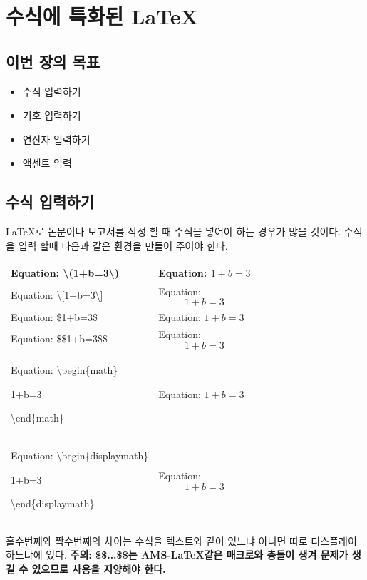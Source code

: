 \documentclass[12pt]{article}
\begin{document}
	\section{수식에 특화된 \LaTeX}
	\subsection{이번 장의 목표}
	\begin{itemize}
		\item 수식 입력하기
		\item 기호 입력하기
		\item 연산자 입력하기
		\item 액센트 입력
	\end{itemize}
	\subsection{수식 입력하기}
	\LaTeX 로 논문이나 보고서를 작성 할 때 수식을 넣어야 하는 경우가 많을 것이다. 수식을 입력 할때 다음과 같은 환경을 만들어 주어야 한다.\newline
	
	\begin{tabularx}{\textwidth \onehalfspacing}{|X|X|}
		\hline
		Equation: \textbackslash (1+b=3\textbackslash ) & Equation: \(1+b=3\)\\
		\hline
		Equation: \textbackslash[1+b=3\textbackslash] & Equation: \[1+b=3\]\\
		\hline
		Equation: \$1+b=3\$ & Equation: $1+b=3$\\
		\hline
		Equation: \$\$1+b=3\$\$ & Equation: $$1+b=3$$\\
		\hline
		Equation:
		\textbackslash begin\{math\}
		
		1+b=3
		
		\textbackslash end\{math\} & 
		Equation:
		\begin{math}
		1+b=3
		\end{math}\\
		\hline
		Equation:
		\textbackslash begin\{displaymath\}
		
		1+b=3
		
		\textbackslash end\{displaymath\} & 
		Equation:
		\begin{displaymath}
		1+b=3
		\end{displaymath}\\
		\hline
	\end{tabularx}
	\newline
	\newline
	홀수번째와 짝수번째의 차이는 수식을 텍스트와 같이 있느냐 아니면 따로 디스플래이 하느냐에 있다. \newline
	{\bf 주의: \$\$...\$\$는 AMS-\LaTeX 같은 매크로와 충돌이 생겨 문제가 생길 수 있으므로 사용을 지양해야 한다.}\clearpage
\end{document}
